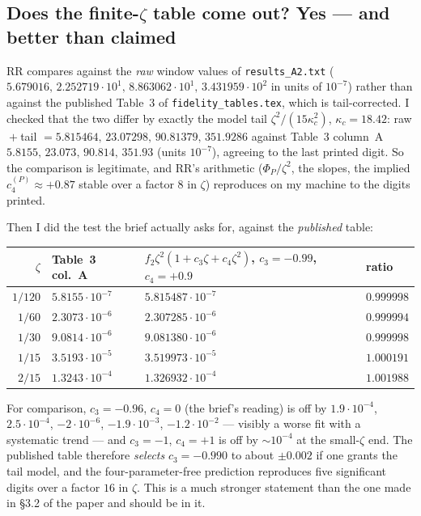 \documentclass[11pt]{article}
\begin{document}
\subsection{Does the finite-$\zeta$ table come out?  Yes --- and better than claimed}

RR compares against the \emph{raw} window values of \texttt{results\_A2.txt}
($5.679016,\,2.252719\cdot10^{1},\,8.863062\cdot10^{1},\,3.431959\cdot10^{2}$ in units of
$10^{-7}$) rather than against the published Table~3 of \texttt{fidelity\_tables.tex}, which is
tail-corrected.  I checked that the two differ by exactly the model tail
$\zeta^2/(15\kappa_c^2)$, $\kappa_c=18.42$: raw${}+{}$tail ${}=5.815464,\,23.07298,\,90.81379,\,
351.9286$ against Table~3 column~A $5.8155,\,23.073,\,90.814,\,351.93$ (units $10^{-7}$), agreeing
to the last printed digit.  So the comparison is legitimate, and RR's arithmetic
($\Phi_P/\zeta^2$, the slopes, the implied $c_4^{(P)}\approx+0.87$ stable over a factor $8$ in
$\zeta$) reproduces on my machine to the digits printed.

Then I did the test the brief actually asks for, against the \emph{published} table:
\begin{center}\small
\begin{tabular}{rlll}\toprule
$\zeta$ & Table~3 col.~A & $f_2\zeta^2(1+c_3\zeta+c_4\zeta^2)$, $c_3=-0.99$, $c_4=+0.9$ & ratio\\
\midrule
$1/120$ & $5.8155\cdot10^{-7}$ & $5.815487\cdot10^{-7}$ & $0.999998$\\
$1/60$ & $2.3073\cdot10^{-6}$ & $2.307285\cdot10^{-6}$ & $0.999994$\\
$1/30$ & $9.0814\cdot10^{-6}$ & $9.081380\cdot10^{-6}$ & $0.999998$\\
$1/15$ & $3.5193\cdot10^{-5}$ & $3.519973\cdot10^{-5}$ & $1.000191$\\
$2/15$ & $1.3243\cdot10^{-4}$ & $1.326932\cdot10^{-4}$ & $1.001988$\\
\bottomrule\end{tabular}\end{center}
\label{tab:tab3}
For comparison, $c_3=-0.96$, $c_4=0$ (the brief's reading) is off by $1.9\cdot10^{-4}$,
$2.5\cdot10^{-4}$, $-2\cdot10^{-6}$, $-1.9\cdot10^{-3}$, $-1.2\cdot10^{-2}$ --- visibly a worse fit
with a systematic trend --- and $c_3=-1$, $c_4=+1$ is off by $\sim10^{-4}$ at the small-$\zeta$ end.
The published table therefore \emph{selects} $c_3=-0.990$ to about $\pm0.002$ if one grants the
tail model, and the four-parameter-free prediction reproduces five significant digits over a factor
$16$ in $\zeta$.  This is a much stronger statement than the one made in \S3.2 of the paper and
should be in it.
\end{document}
